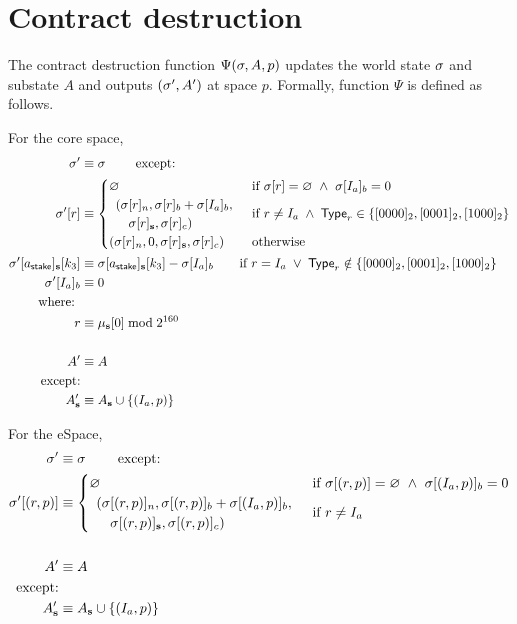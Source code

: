 

\section{Contract destruction}\label{sec:contract_destruct}

The contract destruction function $\Psi(\mathbf{\sigma},A,p)$ updates the world state $\mathbf{\sigma}$ and substate $A$ and outputs $(\mathbf{\sigma}',A')$ at space $p$. Formally, function $\Psi$ is defined as follows.

For the core space,
\begin{align}
	\st'  &\eqdef \st \qquad \mbox{ except:}\\
	\st'[r] &\equiv \begin{cases}
		\varnothing &\text{if}\ \st[r] = \varnothing\ \wedge\ \st[I_{a}]_{b} = 0\\
		\begin{array}{l}
			(\st[r]_{n}, \st[r]_{b} + \st[I_{a}]_{b}, \\
			\quad\st[r]_{\mathbf{s}}, \st[r]_{c})
		\end{array} & \text{if}\ r \neq I_{a} \; \land \; \mathsf{Type}_r\in \{[0000]_2,[0001]_2,[1000]_2\}\\
		(\st[r]_{n}, 0, \st[r]_{\mathbf{s}}, \st[r]_{c}) & \text{otherwise}
	\end{cases}\\
	\st'[a_{\sf stake}]_{\bf s}[k_3] &\eqdef \st[a_{\sf stake}]_{\bf s}[k_3] - \st[I_a]_{b} \qquad \text{if}\ r = I_{a} \; \lor \; \mathsf{Type}_r\notin \{[0000]_2,[0001]_2,[1000]_2\}   \\
	\st'[I_{a}]_{b} &\eqdef 0 \\
		\mbox{where: } &\\ 
		 r &\eqdef \mst_{\mathbf{s}}[0] \bmod 2^{160} \\
	\notag \\
	A' & \eqdef A \\
	\mbox{except:} & \\ 
	A'_{\mathbf{s}} &\eqdef A_{\mathbf{s}} \cup \{(I_a,p)\}
\end{align}

For the eSpace,
\begin{align}
	\st'  &\eqdef \st \qquad \mbox{ except:}\\
	\st'[(r,p)] &\equiv \begin{cases}
		\varnothing &\text{if}\ \st[(r,p)] = \varnothing\ \wedge\ \st[(I_{a},p)]_{b} = 0\\
		\begin{array}{l}
			(\st[(r,p)]_{n}, \st[(r,p)]_{b} + \st[(I_{a},p)]_{b}, \\
			\quad\st[(r,p)]_{\mathbf{s}}, \st[(r,p)]_{c})
		\end{array} & \text{if}\ r \neq I_{a} \\
	\end{cases}\\
	\notag \\
	A' & \eqdef A \\
	\mbox{except:} & \\ 
	A'_{\mathbf{s}} &\eqdef A_{\mathbf{s}} \cup \{(I_a,p)\}
\end{align}